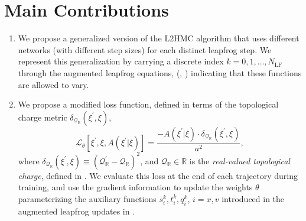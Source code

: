 \documentclass{article} %
\begin{document}
\section{\label{sec:main_contributions}Main Contributions}
\begin{enumerate}
   \item We propose a generalized version of the L2HMC algorithm that uses different networks (with different step
      sizes) for each distinct leapfrog step.
      We represent this generalization by carrying a discrete index \(k = 0, 1, \ldots, N_{\mathrm{LF}}\) through the
      augmented leapfrog equations, (, ) indicating that
      these functions are allowed to vary.
   \item We propose a modified loss function, defined in terms of the topological charge metric
      \(\delta_{\mathcal{Q}_{\mathbb{R}}}(\xi^{\prime}, \xi)\),
      \begin{equation}
         \mathcal{L}_{\theta}{\left[\xi^{\prime},\xi,A(\xi^{\prime}|\xi)\right]} =%
         \frac{-A(\xi^{\prime}|\xi)\cdot \delta_{\mathcal{Q}_{\mathbb{R}}}(\xi^{\prime},\xi)}{a^{2}},
      \end{equation}
      where \(\delta_{\mathcal{Q}_{\mathbb{R}}}(\xi^{\prime}, \xi) \equiv
      {\left(\mathcal{Q}_{\mathbb{R}}^{\prime}-\mathcal{Q}_{\mathbb{R}}\right)}^{2}\), and
      \(\mathcal{Q}_{\mathbb{R}}\in\mathbb{R}\) is the \emph{real-valued topological charge}, defined in
      .
      We evaluate this loss at the end of each trajectory during training, and use the gradient information to update
      the weights \(\theta\) parameterizing the auxiliary functions \(s^{k}_{i}, t^{k}_{i}, q^{k}_{i}\), \(i = x, v\)
      introduced in the augmented leapfrog updates in .

\end{enumerate}
\end{document}
